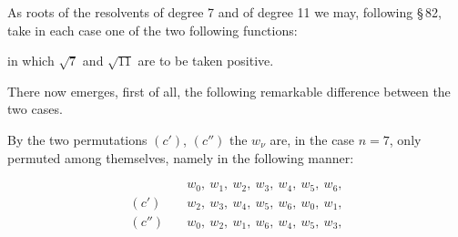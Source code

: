 
As roots of the resolvents of degree 7 and of degree 11 we may, following \S\,82, take in each case one of the two following functions:



in which $\sqrt{7}$ and $\sqrt{11}$ are to be taken positive.

There now emerges, first of all, the following remarkable difference between the two cases.

By the two permutations $(c')$, $(c'')$ the $w_\nu$ are, in the case $n = 7$, only permuted among themselves, namely in the following manner:

\[
\begin{aligned}
& w_0,\ w_1,\ w_2,\ w_3,\ w_4,\ w_5,\ w_6,\\
(c') \quad & w_2,\ w_3,\ w_4,\ w_5,\ w_6,\ w_0,\ w_1,\\
(c'') \quad & w_0,\ w_2,\ w_1,\ w_6,\ w_4,\ w_5,\ w_3,
\end{aligned}
\]

